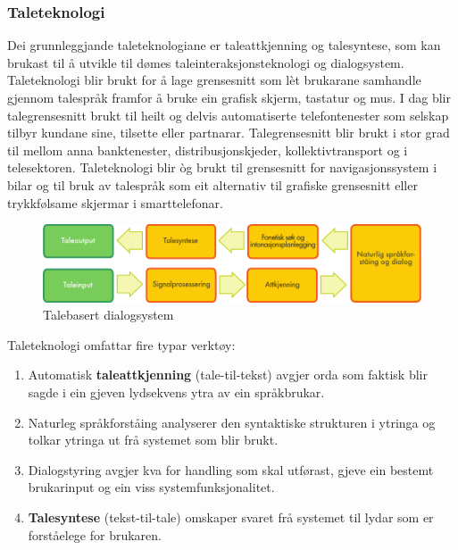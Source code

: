 \begin{multicols}{2}
\subsubsection{Taleteknologi}

Dei grunnleggjande taleteknologiane er taleattkjenning og talesyntese, som kan brukast til å utvikle til dømes taleinteraksjonsteknologi og dialogsystem. Taleteknologi blir brukt for å lage grensesnitt som lèt brukarane samhandle gjennom talespråk framfor å bruke ein grafisk skjerm, tastatur og mus. I dag blir talegrensesnitt brukt til heilt og delvis automatiserte telefontenester som selskap tilbyr kundane sine, tilsette eller partnarar. Talegrensesnitt blir brukt i stor grad til mellom anna banktenester, distribusjonskjeder, kollektivtransport og i telesektoren. Taleteknologi blir òg brukt til grensesnitt for navigasjonssystem i bilar og til bruk av talespråk som eit alternativ til grafiske grensesnitt eller trykkfølsame skjermar i smarttelefonar. 

\begin{figure}[htb]
 \center
 \includegraphics[width=\textwidth]{../_media/norwegian-nynorsk/simple_speech-based_dialogue_architecture}
 \caption{Talebasert dialogsystem}
 \label{fig:dialoguearch_no}
\end{figure}

Taleteknologi omfattar fire typar verktøy: 

\begin{enumerate}
\item Automatisk \textbf{taleattkjenning} (tale-til-tekst) avgjer orda som faktisk blir sagde i ein gjeven lydsekvens ytra av ein språkbrukar.
\item Naturleg språkforståing analyserer den syntaktiske strukturen i ytringa og tolkar ytringa ut frå systemet som blir brukt.
\item Dialogstyring avgjer kva for handling som skal utførast, gjeve ein bestemt brukarinput og ein viss systemfunksjonalitet.
\item \textbf{Talesyntese} (tekst-til-tale) omskaper svaret frå systemet til lydar som er forståelege for brukaren.
\end{enumerate}


\end{multicols}
